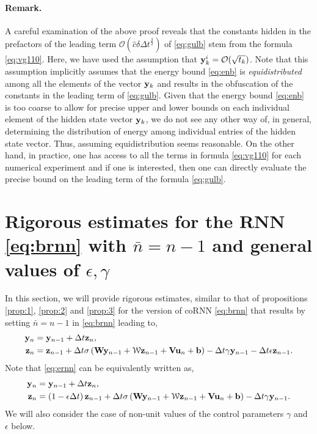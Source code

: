 \documentclass{article} \usepackage{iclr2021_conference,times}
\newcommand{\cW}{\EuScript{W}}
\newcommand{\by}{{\bf y}}
\newcommand{\bz}{{\bf z}}
\newcommand{\bW}{{\bf W}}
\newcommand{\bu}{{\bf u}}
\newcommand{\bb}{{\bf b}}
\newcommand{\bV}{{\bf V}}
\newcommand{\ep}{\epsilon}
\newcommand{\ord}{{\mathcal O}}
\newcommand{\Dt}{{\Delta t}}
\begin{document}
\paragraph{Remark.} A careful examination of the above proof reveals that the constants hidden in the prefactors of the leading term $\ord\left(\hat{c}\delta \Dt^{\frac{3}{2}}\right)$ of \eqref{eq:gulb} stem from the formula \eqref{eq:vg110}. Here, we have used the assumption that $\by_k^i = \ord(\sqrt{t_k})$. Note that this assumption implicitly assumes that the energy bound \eqref{eq:enb} is \emph{equidistributed} among all the elements of the vector $\by_k$ and results in the obfuscation of the constants in the leading term of \eqref{eq:gulb}. Given that the energy bound \eqref{eq:enb} is too coarse to allow for precise upper and lower bounds on each individual element of the hidden state vector $\by_k$, we do not see any other way of, in general, determining the distribution of energy among individual entries of the hidden state vector. Thus, assuming equidistribution seems reasonable. On the other hand, in practice, one has access to all the terms in formula \eqref{eq:vg110} for each numerical experiment and if one is interested, then one can directly evaluate the precise bound on the leading term of the formula \eqref{eq:gulb}. 
\section{Rigorous estimates for the RNN \eqref{eq:brnn} with $\bar{n}=n-1$ and general values of $\ep,\gamma$}
\label{sec:exp}
In this section, we will provide rigorous estimates, similar to that of propositions \ref{prop:1}, \ref{prop:2} and \ref{prop:3} for the version of coRNN \eqref{eq:brnn} that results by setting $\bar{n}=n-1$ in \eqref{eq:brnn} leading to,
\begin{equation}
\label{eq:ernn}
\begin{aligned}
\by_n &= \by_{n-1} + \Dt \bz_n,\\
\bz_n &= \bz_{n-1} + \Dt \sigma\left(\bW\by_{n-1} +  {\bf\cW} \bz_{n-1} + \bV \bu_{n} + \bb \right) -\Dt \gamma \by_{n-1} -  \Dt \ep \bz_{n-1}.  \end{aligned}
\end{equation}
Note that \eqref{eq:ernn} can be equivalently written as,
\begin{equation}
\label{eq:ernn1}
\begin{aligned}
\by_n &= \by_{n-1} + \Dt \bz_n,\\
\bz_n &= \left(1-\ep \Dt\right) \bz_{n-1} + \Dt \sigma\left(\bW\by_{n-1} +  {\bf\cW} \bz_{n-1} + \bV \bu_{n} + \bb \right) -\Dt \gamma \by_{n-1}.  \end{aligned}
\end{equation}
We will also consider the case of non-unit values of the control parameters $\gamma$ and $\ep$ below.
\end{document}
